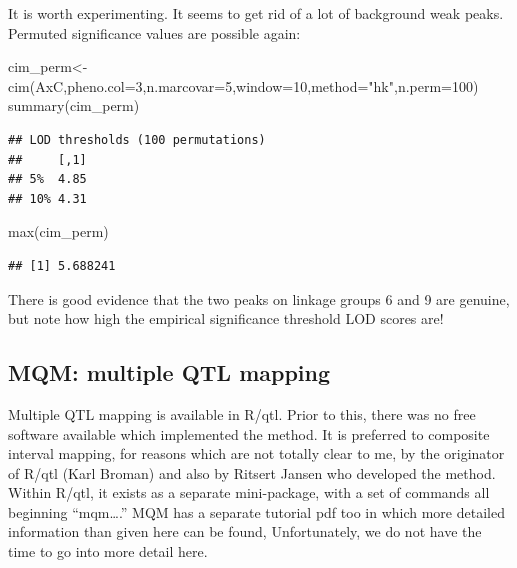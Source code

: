 \documentclass[
]{book}
\newenvironment{Shaded}{\begin{snugshade}}{\end{snugshade}}
\newcommand{\AttributeTok}[1]{\textcolor[rgb]{0.77,0.63,0.00}{#1}}
\newcommand{\DecValTok}[1]{\textcolor[rgb]{0.00,0.00,0.81}{#1}}
\newcommand{\FunctionTok}[1]{\textcolor[rgb]{0.00,0.00,0.00}{#1}}
\newcommand{\NormalTok}[1]{#1}
\newcommand{\OtherTok}[1]{\textcolor[rgb]{0.56,0.35,0.01}{#1}}
\newcommand{\StringTok}[1]{\textcolor[rgb]{0.31,0.60,0.02}{#1}}
\begin{document}
It is worth experimenting. It seems to get rid of a lot of background weak peaks. Permuted significance values are possible again:

\begin{Shaded}
\begin{Highlighting}[]
\NormalTok{cim\_perm}\OtherTok{\textless{}{-}}\FunctionTok{cim}\NormalTok{(AxC,}\AttributeTok{pheno.col=}\DecValTok{3}\NormalTok{,}\AttributeTok{n.marcovar=}\DecValTok{5}\NormalTok{,}\AttributeTok{window=}\DecValTok{10}\NormalTok{,}\AttributeTok{method=}\StringTok{"hk"}\NormalTok{,}\AttributeTok{n.perm=}\DecValTok{100}\NormalTok{) }
\FunctionTok{summary}\NormalTok{(cim\_perm) }
\end{Highlighting}
\end{Shaded}

\begin{verbatim}
## LOD thresholds (100 permutations)
##     [,1]
## 5%  4.85
## 10% 4.31
\end{verbatim}

\begin{Shaded}
\begin{Highlighting}[]
\FunctionTok{max}\NormalTok{(cim\_perm) }
\end{Highlighting}
\end{Shaded}

\begin{verbatim}
## [1] 5.688241
\end{verbatim}

There is good evidence that the two peaks on linkage groups 6 and 9 are genuine, but note how high the empirical significance threshold LOD scores are!

\hypertarget{mqm-multiple-qtl-mapping}{%
\subsection{MQM: multiple QTL mapping}\label{mqm-multiple-qtl-mapping}}

Multiple QTL mapping is available in R/qtl. Prior to this, there was no free software available which implemented the method. It is preferred to composite interval mapping, for reasons which are not totally clear to me, by the originator of R/qtl (Karl Broman) and also by Ritsert Jansen who developed the method. Within R/qtl, it exists as a separate mini-package, with a set of commands all beginning ``mqm\ldots.'' MQM has a separate tutorial pdf too in which more detailed information than given here can be found, Unfortunately, we do not have the time to go into more detail here.
\end{document}
